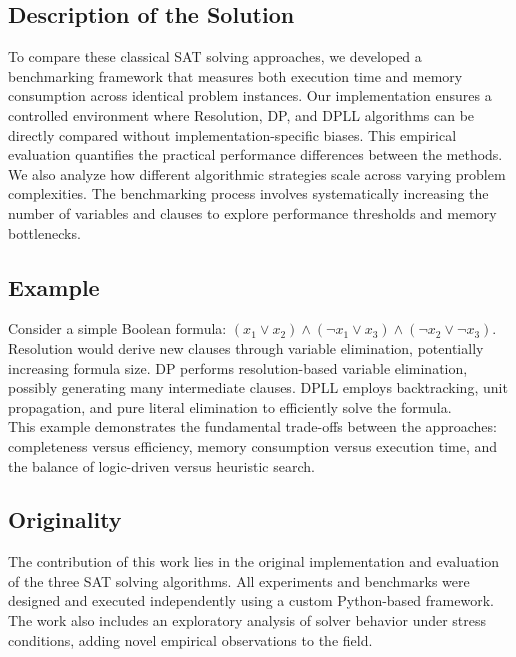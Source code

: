 \documentclass[11pt]{article}
\begin{document}
\subsection*{Description of the Solution}
\hspace*{2em}
To compare these classical SAT solving approaches, we developed a benchmarking framework that measures both execution time and memory consumption across identical problem instances. Our implementation ensures a controlled environment where Resolution, DP, and DPLL algorithms can be directly compared without implementation-specific biases. This empirical evaluation quantifies the practical performance differences between the methods.\\
\hspace*{2em}
We also analyze how different algorithmic strategies scale across varying problem complexities. The benchmarking process involves systematically increasing the number of variables and clauses to explore performance thresholds and memory bottlenecks.

\subsection*{Example}
\hspace*{2em}
Consider a simple Boolean formula: \((x_1 \lor x_2) \land (\lnot x_1 \lor x_3) \land (\lnot x_2 \lor \lnot x_3)\). Resolution would derive new clauses through variable elimination, potentially increasing formula size. DP performs resolution-based variable elimination, possibly generating many intermediate clauses. DPLL employs backtracking, unit propagation, and pure literal elimination to efficiently solve the formula.\\
\hspace*{2em}
This example demonstrates the fundamental trade-offs between the approaches: completeness versus efficiency, memory consumption versus execution time, and the balance of logic-driven versus heuristic search.

\subsection*{Originality}
\hspace*{2em}
The contribution of this work lies in the original implementation and evaluation of the three SAT solving algorithms. All experiments and benchmarks were designed and executed independently using a custom Python-based framework. The work also includes an exploratory analysis of solver behavior under stress conditions, adding novel empirical observations to the field.
\end{document}
